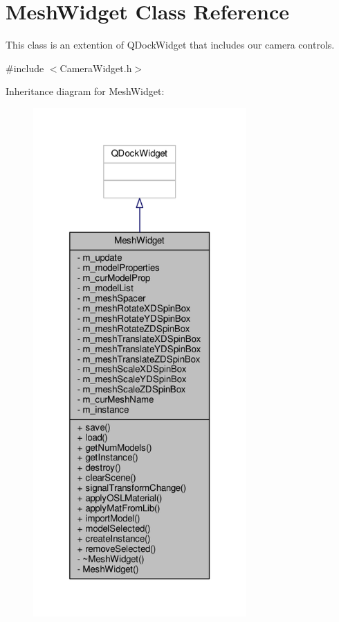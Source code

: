 \hypertarget{class_mesh_widget}{\section{Mesh\-Widget Class Reference}
\label{class_mesh_widget}
}


This class is an extention of Q\-Dock\-Widget that includes our camera controls.  




{\ttfamily \#include $<$Camera\-Widget.\-h$>$}



Inheritance diagram for Mesh\-Widget\-:
\nopagebreak
\begin{figure}[H]
\begin{center}
\leavevmode
\includegraphics[height=550pt]{class_mesh_widget__inherit__graph}
\end{center}
\end{figure}


